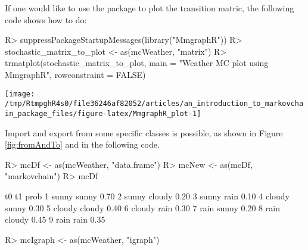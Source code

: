 \documentclass[
  nojss]{jss}
\begin{document}
If one would like to use the  package \citep{pkg:MmgraphR} to plot the transition matric, the following code shows how to do:

\begin{CodeChunk}

\begin{CodeInput}
R> suppressPackageStartupMessages(library("MmgraphR"))
R> stochastic_matrix_to_plot <- as(mcWeather, "matrix")
R> trmatplot(stochastic_matrix_to_plot, main = "Weather MC plot using MmgraphR", rowconstraint = FALSE)
\end{CodeInput}


\begin{center}\texttt{[image: /tmp/RtmpghR4s0/file36246af82052/articles/an\_introduction\_to\_markovchain\_package\_files/figure-latex/MmgraphR\_plot-1]} \end{center}

\end{CodeChunk}

Import and export from some specific classes is possible, as shown in Figure \ref{fig:fromAndTo} and in the following code.

\begin{CodeChunk}

\begin{CodeInput}
R> mcDf <- as(mcWeather, "data.frame")
R> mcNew <- as(mcDf, "markovchain")
R> mcDf
\end{CodeInput}

\begin{CodeOutput}
      t0     t1 prob
1  sunny  sunny 0.70
2  sunny cloudy 0.20
3  sunny   rain 0.10
4 cloudy  sunny 0.30
5 cloudy cloudy 0.40
6 cloudy   rain 0.30
7   rain  sunny 0.20
8   rain cloudy 0.45
9   rain   rain 0.35
\end{CodeOutput}

\begin{CodeInput}
R> mcIgraph <- as(mcWeather, "igraph")
\end{CodeInput}
\end{CodeChunk}
\end{document}
